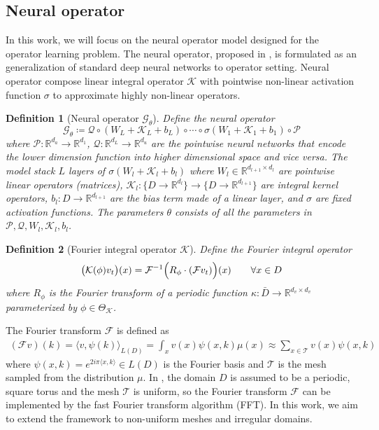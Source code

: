 \documentclass{article}
\newcommand{\R}{\mathbb{R}}
\newcommand{\cK}{\mathcal{K}}
\newcommand{\cP}{\mathcal{P}}
\newcommand{\cQ}{\mathcal{Q}}
\newcommand{\F}{\mathcal{F}}
\newcommand{\G}{\mathcal{G}}
\newcommand{\T}{\mathcal{T}}
\newtheorem{definition}{Definition}
\begin{document}
\subsection{Neural operator }

In this work, we will focus on the neural operator model designed for the operator learning problem.
The neural operator, proposed in \citep{li2020neural}, is formulated as an generalization of standard deep neural networks to operator setting. Neural operator compose linear integral operator $\cK$ with pointwise non-linear activation function \(\sigma\) to approximate highly non-linear operators.
\begin{definition}[Neural operator $\G_\theta$] Define the neural operator
\begin{equation}
\label{eq:G}
    \G_{\theta} \coloneqq \cQ \circ(W_{L} + \cK_{L} + b_L) \circ \cdots \circ \sigma(W_1 + \cK_1 + b_1) \circ \cP
\end{equation}
where \(\cP: \R^{d_a} \to \R^{d_{1}}\), \(\cQ: \R^{d_{L}} \to \R^{d_u}\) are the pointwise neural networks that encode the lower dimension function into higher dimensional space and vice versa. The model stack $L$ layers of $\sigma(W_{l} + \cK_{l} + b_{l})$ where \(W_l \in \R^{d_{{l+1}} \times d_{l}}\) are pointwise linear operators (matrices), \(\cK_l: \{D \to \R^{d_{l}}\} \to \{D \to \R^{d_{l+1}}\}\) are integral kernel operators, $b_l: D \to \R^{d_{l+1}} $ are the bias term made of a linear layer, and \(\sigma\) are fixed activation functions. The parameters $\theta$ consists of all the parameters in $\cP, \cQ, W_l, \cK_l, b_l$.
\end{definition}


\begin{definition}[Fourier integral operator $\cK$] Define the Fourier integral operator
\begin{equation}
\label{eq:Fourier}
\bigl(\cK(\phi)v_t\bigr)(x)=   
\F^{-1}\Bigl(R_\phi \cdot (\F v_t) \Bigr)(x) \qquad \forall x \in D 
\end{equation}
where $R_\phi$ is the Fourier transform of a periodic function $\kappa: \bar{D} \to \R^{d_v \times d_v}$ parameterized by \(\phi \in \Theta_\cK\).
\end{definition}
The Fourier transform $\F$ is defined as 
\begin{align}
    (\F v)(k) 
    = \langle v, \psi(k) \rangle_{L(D)}
    = \int_x v(x) \psi(x,k) \mu(x) 
    \approx \sum_{x\in\T} v(x) \psi(x,k)
\end{align}
where $\psi(x,k) = e^{2i \pi \langle x, k \rangle} \in L(D)$ is the Fourier basis and $\T$ is the mesh sampled from the distribution $\mu$.
In \cite{li2020neural}, the domain $D$ is assumed to be a periodic, square torus and the mesh $\T$ is uniform, so the Fourier transform $\F$ can be implemented by the fast Fourier transform algorithm (FFT). In this work, we aim to extend the framework to non-uniform meshes and irregular domains.
\end{document}
